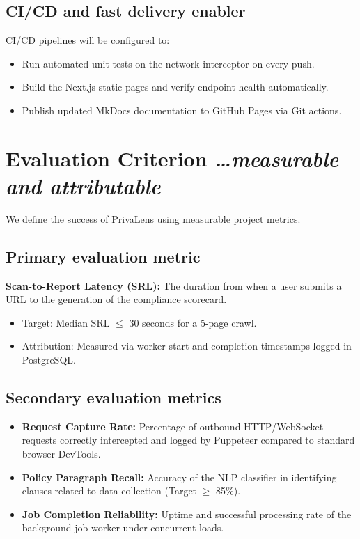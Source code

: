\documentclass[11pt,a4paper]{article}
\newcommand{\BvrHint}[1]{{\normalfont\normalsize\itshape\hfill #1}}
\begin{document}
\subsection{CI/CD and fast delivery enabler}
CI/CD pipelines will be configured to:
\begin{itemize}[leftmargin=0.7cm]
    \item Run automated unit tests on the network interceptor on every push.
    \item Build the Next.js static pages and verify endpoint health automatically.
    \item Publish updated MkDocs documentation to GitHub Pages via Git actions.
\end{itemize}

\section{Evaluation Criterion %
\BvrHint{\ldots measurable and attributable}}
We define the success of PrivaLens using measurable project metrics.

\subsection{Primary evaluation metric}
\textbf{Scan-to-Report Latency (SRL):} The duration from when a user submits a URL to the generation of the compliance scorecard.
\begin{itemize}[leftmargin=0.7cm]
    \item Target: Median SRL $\le$ 30 seconds for a 5-page crawl.
    \item Attribution: Measured via worker start and completion timestamps logged in PostgreSQL.
\end{itemize}

\subsection{Secondary evaluation metrics}
\begin{itemize}[leftmargin=0.7cm]
    \item \textbf{Request Capture Rate:} Percentage of outbound HTTP/WebSocket requests correctly intercepted and logged by Puppeteer compared to standard browser DevTools.
    \item \textbf{Policy Paragraph Recall:} Accuracy of the NLP classifier in identifying clauses related to data collection (Target $\ge$ 85\%).
    \item \textbf{Job Completion Reliability:} Uptime and successful processing rate of the background job worker under concurrent loads.
\end{itemize}
\end{document}
